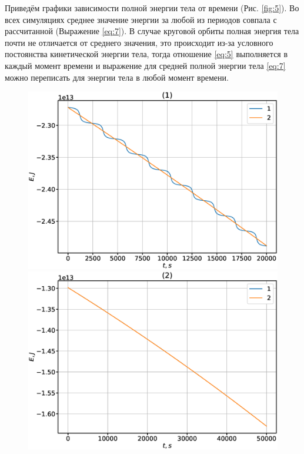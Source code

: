 \documentclass[12pt]{article}
\begin{document}
Приведём графики зависимости полной энергии тела от времени (Рис. \ref{fig:5}). Во всех симуляциях среднее значение энергии за любой из периодов
совпала с рассчитанной (Выражение \ref{eq:7}). В случае круговой орбиты полная энергия тела почти не отличается от среднего значения, это происходит
из-за условного постоянства кинетической энергии тела, тогда отношение \ref{eq:5} выполняется в каждый момент времени и выражение для средней полной
энергии тела \ref{eq:7} можно переписать для энергии тела в любой момент времени.
\begin{figure}[H]
      \includegraphics[width=1.0\linewidth]{En_t_1.eps}
    \endminipage\hfill
      \includegraphics[width=1.0\linewidth]{En_t_2.eps}
    \endminipage\hfill

\end{figure}
\end{document}
